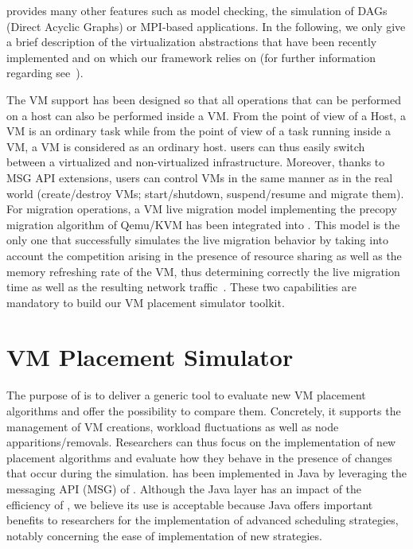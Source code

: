\sg provides many other features such as model checking, the
simulation of DAGs (Direct Acyclic Graphs) or MPI-based
applications. In the following, we only give a brief description of
the virtualization abstractions that have been recently implemented
and on which our framework relies on (for further information regarding
\sg see~\cite{casanova:hal-01017319}).

The VM support has been designed so that all operations that can be
performed on a host can also be performed inside a VM. From the point
of view of a \sg Host, a \sg VM is an ordinary task while from the
point of view of a task running inside a \sg VM, a VM is considered as
an ordinary host.
\sg users can thus easily switch between a virtualized and
non-virtualized infrastructure.  Moreover, thanks to MSG API
extensions, users can control VMs in the same manner as in the real
world (\eg create/destroy VMs; start/shutdown, suspend/resume and
migrate them).
For migration operations, a VM live migration model implementing the
precopy migration algorithm of Qemu/KVM has been integrated into \sg.
This model is the only one that successfully simulates the live
migration behavior by taking into account the competition arising in
the presence of resource sharing as well as the memory refreshing rate
of the VM, thus determining correctly the live migration time as well
as the resulting network
traffic~\cite{Hirofuchi:2013:ALM:2568486.2568524}.
%
%
These two capabilities are mandatory to build our VM placement
simulator toolkit.

\section{VM Placement Simulator}
\label{sec:injector}

The purpose of \vmps is to deliver a generic tool to evaluate new VM
placement algorithms and offer the possibility to compare
them. Concretely, it supports the management of VM creations, workload
fluctuations as well as node apparitions/removals.  Researchers can
thus focus on the implementation of new placement algorithms and
evaluate how they behave in the presence of changes that occur during
the simulation.
%
\vmps has been implemented in Java by leveraging the messaging API
(MSG) of \sg.  Although the Java layer has an impact of the efficiency
of \sg, we believe its use is acceptable because Java offers important
benefits to researchers for the implementation of advanced scheduling
strategies, notably concerning the ease of implementation of new
strategies. 

